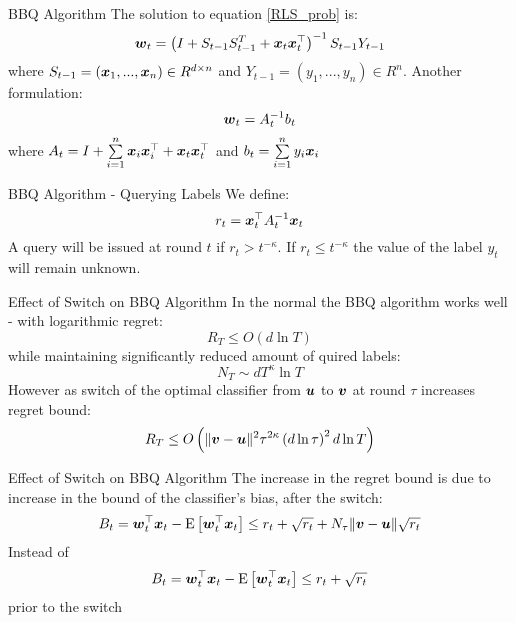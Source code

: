 \documentclass{beamer}
\begin{document}
\begin{frame}{BBQ Algorithm}
The solution to equation \ref{RLS_prob} is:
\begin{equation}
{\boldsymbol{w}}_{t}=\left(I+S_{t-1}S_{t-1}^T+ {\boldsymbol{x}}_{t} {{\boldsymbol{x}}}^{\top}_{t}\right)^{-1}S_{t-1}Y_{t-1}
\label{RLS}
\end{equation}
where $S_{t-1}=({\boldsymbol{x}}_{1},...,{\boldsymbol{x}}_{n})\in R^{d\times n}$ and $Y_{t-1}=(y_1,...,y_n)\in R^n$.\newline
Another formulation:
\begin{equation}
{\boldsymbol{w}}_{t}=A_{t}^{-1}b_t
\label{RLS2}
\end{equation}
where $A_t=I+\sum\limits_{i=1}^{n}{\boldsymbol{x}}_{i} {{\boldsymbol{x}}}^{\top}_{i}+ {\boldsymbol{x}}_{t} {{\boldsymbol{x}}}^{\top}_{t}$ and $b_t=\sum\limits_{i=1}^{n}y_i{\boldsymbol{x}}_{i}$ 
\end{frame}

\begin{frame}{BBQ Algorithm - Querying Labels}
We define:
\begin{equation}
r_t={{\boldsymbol{x}}}^{\top}_{t}A_{t}^{-1}{\boldsymbol{x}}_{t}
\end{equation}
\newline
\newline
A query will be issued at round $t$ if $r_t> t^{-\kappa}$.\newline
\newline
\newline
If $r_t\leq t^{-\kappa}$ the value of the label $y_t$ will remain unknown.
\end{frame}

\begin{frame}{Effect of Switch on BBQ Algorithm}
In the normal the BBQ algorithm works well - with logarithmic regret:
\begin{equation}
 R_T\leq O\left(d\ln{T}\right)
\end{equation}
while maintaining significantly reduced amount of quired labels:
\begin{equation}
N_T\sim dT^{\kappa}\ln{T}
\end{equation}
However as switch of the optimal classifier from ${\boldsymbol{u}}$ to ${\boldsymbol{v}}$ at round $\tau$ increases regret bound:
\begin{equation}
 R_T\leq O\left(\|{\boldsymbol{v}}-{\boldsymbol{u}}\|^2{\tau}^{2\kappa}\left(d\ln{\tau}\right)^2d\ln{T}\right)
\end{equation}
 
\end{frame}


\begin{frame}{Effect of Switch on BBQ Algorithm}
The increase in the regret bound is due to increase in the bound of the classifier's bias, after the switch:
\begin{equation}
B_t={{\boldsymbol{w}}}^{\top}_{t}{\boldsymbol{x}}_{t}-{\rm E}\left[{{{\boldsymbol{w}}}^{\top}_{t}{\boldsymbol{x}}_{t}}\right]\leq r_t+\sqrt{r_t}+N_{\tau}\|{\boldsymbol{v}}-{\boldsymbol{u}}\|\sqrt{r_t}
\end{equation}
Instead of 
\begin{equation}
B_t={{\boldsymbol{w}}}^{\top}_{t}{\boldsymbol{x}}_{t}-{\rm E}\left[{{{\boldsymbol{w}}}^{\top}_{t}{\boldsymbol{x}}_{t}}\right]\leq r_t+\sqrt{r_t}
\end{equation}
prior to the switch
\end{frame}
\end{document}
